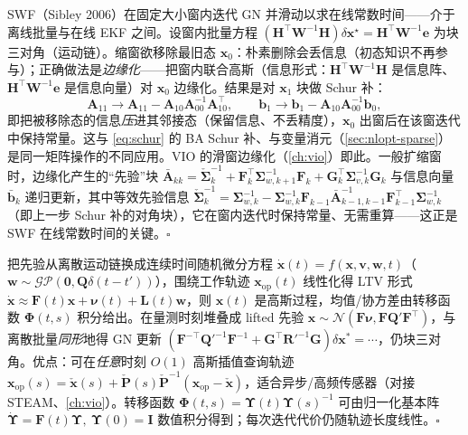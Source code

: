 \begin{derivation}[$\star$ 滑动窗口滤波：边缘化 $=$ Schur 补]
SWF（Sibley 2006）在固定大小窗内迭代 GN 并滑动以求在线常数时间——介于离线批量与在线 EKF 之间。设窗内批量方程 $(\mathbf{H}^\top\mathbf{W}^{-1}\mathbf{H})\delta\mathbf{x}^\star=\mathbf{H}^\top\mathbf{W}^{-1}\mathbf{e}$ 为块三对角（运动链）。缩窗欲移除最旧态 $\mathbf{x}_0$：朴素删除会丢信息（初态知识不再参与）；正确做法是\emph{边缘化}——把窗内联合高斯（信息形式：$\mathbf{H}^\top\mathbf{W}^{-1}\mathbf{H}$ 是信息阵、$\mathbf{H}^\top\mathbf{W}^{-1}\mathbf{e}$ 是信息向量）对 $\mathbf{x}_0$ 边缘化。结果是对 $\mathbf{x}_1$ 块做 Schur 补：
\[
  \mathbf{A}_{11}\to\mathbf{A}_{11}-\mathbf{A}_{10}\mathbf{A}_{00}^{-1}\mathbf{A}_{10}^\top,\qquad
  \mathbf{b}_1\to\mathbf{b}_1-\mathbf{A}_{10}\mathbf{A}_{00}^{-1}\mathbf{b}_0,
\]
即把被移除态的信息\emph{压}进其邻接态（保留信息、不丢精度），$\mathbf{x}_0$ 出窗后在该窗迭代中保持常量。这与 \cref{eq:schur} 的 BA Schur 补、与变量消元（\cref{sec:nlopt-sparse}）是同一矩阵操作的不同应用。VIO 的滑窗边缘化（\cref{ch:vio}）即此。一般扩缩窗时，边缘化产生的“先验”块 $\bar{\mathbf{A}}_{kk}=\check{\boldsymbol{\Sigma}}_k^{-1}+\mathbf{F}_k^\top\boldsymbol{\Sigma}_{w,k+1}^{-1}\mathbf{F}_k+\mathbf{G}_k^\top\boldsymbol{\Sigma}_{v,k}^{-1}\mathbf{G}_k$ 与信息向量 $\bar{\mathbf{b}}_k$ 递归更新，其中等效先验信息 $\check{\boldsymbol{\Sigma}}_k^{-1}=\boldsymbol{\Sigma}_{w,k}^{-1}-\boldsymbol{\Sigma}_{w,k}^{-1}\mathbf{F}_{k-1}\bar{\mathbf{A}}_{k-1,k-1}^{-1}\mathbf{F}_{k-1}^\top\boldsymbol{\Sigma}_{w,k}^{-1}$（即上一步 Schur 补的对角块），它在窗内迭代时保持常量、无需重算——这正是 SWF 在线常数时间的关键\cite{barfoot2024state}。\hfill$\square$
\end{derivation}

\begin{derivation}
把先验从离散运动链换成连续时间随机微分方程 $\dot{\mathbf{x}}(t)=f(\mathbf{x},\mathbf{v},\mathbf{w},t)$（$\mathbf{w}\sim\mathcal{GP}(\mathbf{0},\mathbf{Q}\delta(t-t'))$），围绕工作轨迹 $\mathbf{x}_{\mathrm{op}}(t)$ 线性化得 LTV 形式 $\dot{\mathbf{x}}\approx\mathbf{F}(t)\mathbf{x}+\boldsymbol{\nu}(t)+\mathbf{L}(t)\mathbf{w}$，则 $\mathbf{x}(t)$ 是高斯过程，均值/协方差由转移函数 $\boldsymbol{\Phi}(t,s)$ 积分给出。在量测时刻堆叠成 lifted 先验 $\mathbf{x}\sim\mathcal{N}(\mathbf{F}\boldsymbol{\nu},\mathbf{F}\mathbf{Q}'\mathbf{F}^\top)$，与离散批量\emph{同形}地得 GN 更新 $(\mathbf{F}^{-\top}\mathbf{Q}'^{-1}\mathbf{F}^{-1}+\mathbf{G}^\top\mathbf{R}'^{-1}\mathbf{G})\delta\mathbf{x}^*=\cdots$，仍块三对角。优点：可在\emph{任意}时刻 $O(1)$ 高斯插值查询轨迹 $\mathbf{x}_{\mathrm{op}}(s)=\check{\mathbf{x}}(s)+\check{\mathbf{P}}(s)\check{\mathbf{P}}^{-1}(\mathbf{x}_{\mathrm{op}}-\check{\mathbf{x}})$，适合异步/高频传感器（对接 STEAM、\cref{ch:vio}）。转移函数 $\boldsymbol{\Phi}(t,s)=\boldsymbol{\Upsilon}(t)\boldsymbol{\Upsilon}(s)^{-1}$ 可由归一化基本阵 $\dot{\boldsymbol{\Upsilon}}=\mathbf{F}(t)\boldsymbol{\Upsilon},\ \boldsymbol{\Upsilon}(0)=\mathbf{I}$ 数值积分得到；每次迭代代价仍随轨迹长度线性\cite{barfoot2024state}。\hfill$\square$
\end{derivation}
